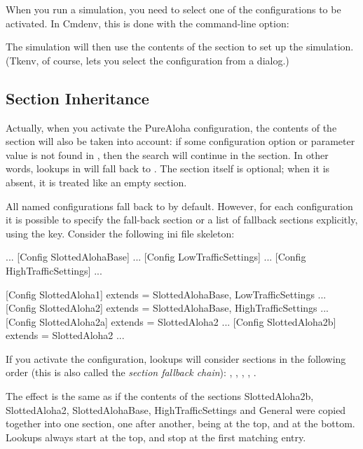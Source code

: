 When you run a simulation, you need to select one of the configurations
to be activated. In Cmdenv, this is done with the  command-line option:


The simulation will then use the contents of the 
section to set up the simulation. (Tkenv, of course, lets you select
the configuration from a dialog.)


\subsection{Section Inheritance}
\label{sec:config-sim:section-inheritance}

Actually, when you activate the PureAloha configuration, the contents of
the \ttt{[General]} section will also be taken into account: if some
configuration option or parameter value is not found in ,
then the search will continue in the \ttt{[General]} section. In
other words, lookups in  will fall back to \ttt{[General]}.
The \ttt{[General]} section itself is optional; when it is absent, it is
treated like an empty \ttt{[General]} section.

All named configurations fall back to \ttt{[General]} by default. However, for
each configuration it is possible to specify the fall-back section or a list of
fallback sections explicitly, using the  key. Consider the
following ini file skeleton:

\begin{inifile}
[General]
...
[Config SlottedAlohaBase]
...
[Config LowTrafficSettings]
...
[Config HighTrafficSettings]
...

[Config SlottedAloha1]
extends = SlottedAlohaBase, LowTrafficSettings
...
[Config SlottedAloha2]
extends = SlottedAlohaBase, HighTrafficSettings
...
[Config SlottedAloha2a]
extends = SlottedAloha2
...
[Config SlottedAloha2b]
extends = SlottedAloha2
...
\end{inifile}


If you activate the  configuration, lookups will consider
sections in the following order (this is also called the
\textit{section fallback chain}): ,
, , ,
.

The effect is the same as if the contents of the sections
SlottedAloha2b, SlottedAloha2, SlottedAlohaBase, HighTrafficSettings and
General were copied together into one section, one after another,
 being at the top, and \ttt{[General]}
at the bottom. Lookups always start at the top, and stop at the first
matching entry.

